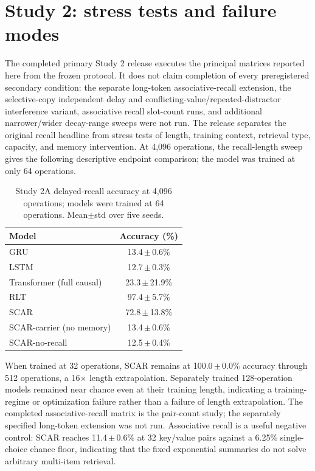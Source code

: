 \documentclass{article}
\begin{document}
\section{Study 2: stress tests and failure modes}
The completed primary Study 2 release executes the principal matrices reported here from the frozen protocol. It does not claim completion of every preregistered secondary condition: the separate long-token associative-recall extension, the selective-copy independent delay and conflicting-value/repeated-distractor interference variant, associative recall slot-count runs, and additional narrower/wider decay-range sweeps were not run. The release separates the original recall headline from stress tests of length, training context, retrieval type, capacity, and memory intervention. At 4,096 operations, the recall-length sweep gives the following descriptive endpoint comparison; the model was trained at only 64 operations.
\begin{table}[t]
\centering\small
\caption{Study 2A delayed-recall accuracy at 4,096 operations; models were trained at 64 operations. Mean$\pm$std over five seeds.}\label{tab:study2-recall}
\begin{tabular}{l c}
\toprule
Model & Accuracy (\%) \\
\midrule
GRU & 13.4\,$\pm$\,0.6\% \\
LSTM & 12.7\,$\pm$\,0.3\% \\
Transformer (full causal) & 23.3\,$\pm$\,21.9\% \\
RLT & 97.4\,$\pm$\,5.7\% \\
SCAR & 72.8\,$\pm$\,13.8\% \\
SCAR-carrier (no memory) & 13.4\,$\pm$\,0.6\% \\
SCAR-no-recall & 12.5\,$\pm$\,0.4\% \\
\bottomrule
\end{tabular}
\end{table}
When trained at 32 operations, SCAR remains at 100.0\,$\pm$\,0.0\% accuracy through 512 operations, a 16$\times$ length extrapolation. Separately trained 128-operation models remained near chance even at their training length, indicating a training-regime or optimization failure rather than a failure of length extrapolation. The completed associative-recall matrix is the pair-count study; the separately specified long-token extension was not run. Associative recall is a useful negative control: SCAR reaches 11.4\,$\pm$\,0.6\% at 32 key/value pairs against a 6.25\% single-choice chance floor, indicating that the fixed exponential summaries do not solve arbitrary multi-item retrieval.
\end{document}
